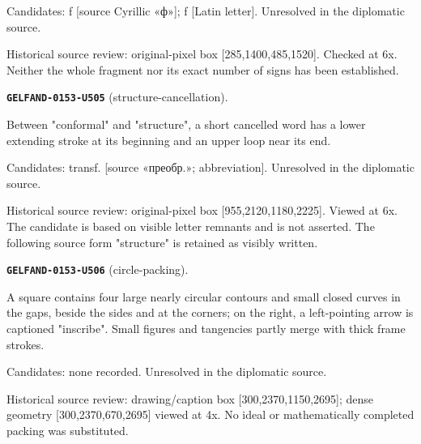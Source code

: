 Candidates: f [source Cyrillic «ф»]; f [Latin letter]. Unresolved in the diplomatic source.\par
Historical source review: original-pixel box [285,1400,485,1520]. Checked at 6x. Neither the whole fragment nor its exact number of signs has been established.\par\medskip
\par\noindent\leavevmode{}\label{GELFAND-0153-U505}\textbf{\texttt{GELFAND-0153-U505}} (structure-cancellation).\nopagebreak[4]\par
Between "conformal" and "structure", a short cancelled word has a lower extending stroke at its beginning and an upper loop near its end.\par
Candidates: transf. [source «преобр.»; abbreviation]. Unresolved in the diplomatic source.\par
Historical source review: original-pixel box [955,2120,1180,2225]. Viewed at 6x. The candidate is based on visible letter remnants and is not asserted. The following source form "structure" is retained as visibly written.\par\medskip
\par\noindent\leavevmode{}\label{GELFAND-0153-U506}\textbf{\texttt{GELFAND-0153-U506}} (circle-packing).\nopagebreak[4]\par
A square contains four large nearly circular contours and small closed curves in the gaps, beside the sides and at the corners; on the right, a left-pointing arrow is captioned "inscribe". Small figures and tangencies partly merge with thick frame strokes.\par
Candidates: none recorded. Unresolved in the diplomatic source.\par
Historical source review: drawing/caption box [300,2370,1150,2695]; dense geometry [300,2370,670,2695] viewed at 4x. No ideal or mathematically completed packing was substituted.\par\medskip

